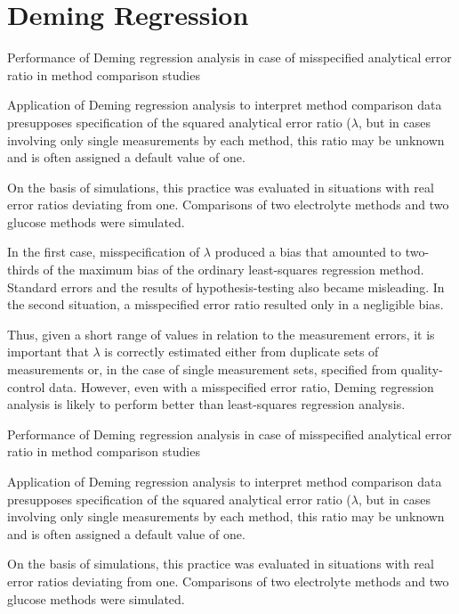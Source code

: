 \newpage
\section*{Deming Regression}

Performance of Deming regression analysis in case of misspecified analytical error ratio in method comparison studies

Application of Deming regression analysis to interpret method comparison data presupposes specification of the 
squared analytical error ratio ($\lambda$, but in cases involving only single measurements by each method, this 
ratio may be unknown and is often assigned a default value of one. 

On the basis of simulations, this practice was evaluated in situations with real error ratios deviating from one. 
Comparisons of two electrolyte methods and two glucose methods were simulated. 

In the first case, misspecification of $\lambda$ produced a bias that amounted to two-thirds of the maximum bias of the 
ordinary least-squares regression method. Standard errors and the results of hypothesis-testing also became misleading. 
In the second situation, a misspecified error ratio resulted only in a negligible bias. 

Thus, given a short range of values in relation to the measurement errors, it is important that $\lambda$ is correctly 
estimated either from duplicate sets of measurements or, in the case of single measurement sets, specified from 
quality-control data. However, even with a misspecified error ratio, Deming regression analysis is likely to perform 
better than least-squares regression analysis.


\newpage
Performance of Deming regression analysis in case of misspecified analytical error ratio in method comparison studies

Application of Deming regression analysis to interpret method comparison data presupposes specification of the 
squared analytical error ratio ($\lambda$, but in cases involving only single measurements by each method, this 
ratio may be unknown and is often assigned a default value of one. 

On the basis of simulations, this practice was evaluated in situations with real error ratios deviating from one. 
Comparisons of two electrolyte methods and two glucose methods were simulated. 

